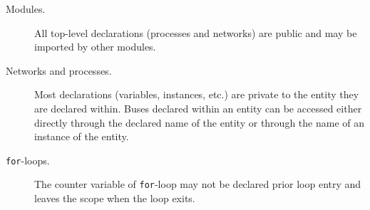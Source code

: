 \begin{description}
\item[Modules.] All top-level declarations (processes and networks) are public
  and may be imported by other modules.
\item[Networks and processes.] Most declarations (variables, instances, etc.)
  are private to the entity they are declared within. Buses declared within an
  entity can be accessed either directly through the declared name of the entity
  or through the name of an instance of the entity.
\item[\texttt{for}-loops.] The counter variable of \texttt{for}-loop may not be
  declared prior loop entry and leaves the scope when the loop exits.
\end{description}




\enlargethispage{2em}
